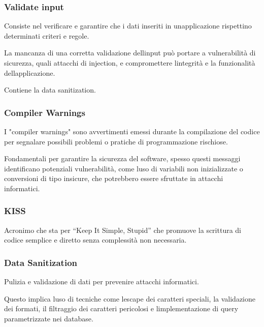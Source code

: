 \documentclass[
]{article}
\begin{document}
\subsubsection{\texorpdfstring{{Validate
input}}{Validate input}}\label{h.lpp5rzin7zu6}

{Consiste nel verificare e garantire che i dati inseriti in
un\textquotesingle applicazione rispettino determinati criteri e
regole.}

{La mancanza di una corretta validazione dell\textquotesingle input può
portare a vulnerabilità di sicurezza, quali attacchi di injection, e
compromettere l\textquotesingle integrità e la funzionalità
dell\textquotesingle applicazione. }

{}

{Contiene la data sanitization.}

\subsubsection{\texorpdfstring{{Compiler
Warnings}}{Compiler Warnings}}\label{h.6641qng6302v}

{I "compiler warnings" sono avvertimenti emessi durante la compilazione
del codice per segnalare possibili problemi o pratiche di programmazione
rischiose. }

{Fondamentali per garantire la sicurezza del software, spesso questi
messaggi identificano potenziali vulnerabilità, come
l\textquotesingle uso di variabili non inizializzate o conversioni di
tipo insicure, che potrebbero essere sfruttate in attacchi informatici.
}

\subsubsection{\texorpdfstring{{KISS}}{KISS}}\label{h.2lhn1uftxvo9}

{Acronimo che sta per ``Keep It Simple, Stupid'' che promuove la
scrittura di codice semplice e diretto senza complessità non
necessaria.}

\subsubsection{\texorpdfstring{{Data
Sanitization}}{Data Sanitization}}\label{h.f03jvneprplf}

{Pulizia e validazione di dati per prevenire attacchi informatici.}

{Questo implica l\textquotesingle uso di tecniche come
l\textquotesingle escape dei caratteri speciali, la validazione dei
formati, il filtraggio dei caratteri pericolosi e
l\textquotesingle implementazione di query parametrizzate nei database.}
\end{document}

